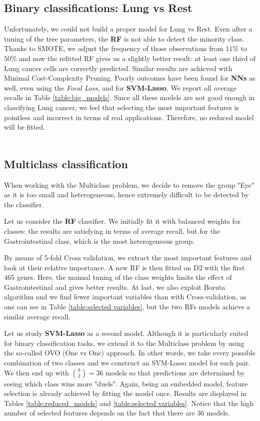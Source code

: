 \documentclass[a4paper,11pt, oneside]{article}  %
\begin{document}
\subsection{Binary classifications: Lung vs Rest}
Unfortunately,  we could not build a proper model for Lung vs Rest.  Even after a tuning of the tree parameters,  the \textbf{RF} is not able to detect the minority class.  Thanks to SMOTE, we adjust the frequency of those observations from $11\%$ to $50\%$ and now the refitted RF gives us a slightly better result: at least one third of Lung cancer cells are correctly predicted.  Similar results are achieved with Minimal Cost-Complexity Pruning. Poorly outcomes have been found for \textbf{NNs} as well, even using the \textit{Focal Loss}, and for \textbf{SVM-Lasso}. We report all average recalls in Table \ref{table:big_models}. Since all these models are not good enough in classifying Lung cancer, we feel that selecting the most important features is pointless and incorrect in terms of real applications. Therefore, no reduced model will be fitted.
\\
\\
\subsection{Multiclass classification}
When working with the Multiclass problem, we decide to remove the group "Eye" as it is too small and heterogeneous, hence extremely difficult to be detected by the classifier. 

Let us consider the \textbf{RF} classifier. We initially fit it with balanced weights for classes: the results are satisfying in terms of average recall, but for the Gastrointestinal class, which is the most heterogeneous group.

By means of 5-fold Cross validation, we extract the most important features and look at their relative importance. A new RF is then fitted on D2 with the first $465$ genes. Here, the manual tuning of the class weights limits the effect of Gastrointestinal and gives better results.  At last, we also exploit Boruta algorithm and we find fewer important variables than with Cross-validation,  as one can see in Table \ref{table:selected variables},  but the two RFs models achieve a similar average recall.

Let us study \textbf{SVM-Lasso} as a second model.  Although it is particularly suited for binary classification tasks, we extend it to the Multiclass problem by using the so-called OVO (One vs One) approach. In other words, we take every possible combination of two classes and we construct an SVM-Lasso model for each pair. We then end up with $ \binom{9}{2} = 36$ models so that predictions are determined by seeing which class wins more "duels". Again,  being an embedded model, feature selection is already achieved by fitting the model once.  Results are displayed in Tables \ref{table:reduced_models} and \ref{table:selected variables}. Notice that the high number of selected features depends on the fact that there are 36 models.  
\end{document}
